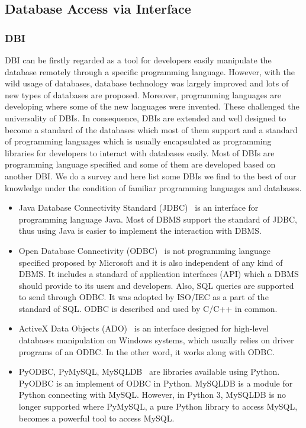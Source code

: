 \documentclass[onecolumn, conference, 12pt]{IEEEtran}
\begin{document}
	
	
	\subsection{Database Access via Interface}
	\subsubsection{DBI}
	DBI can be firstly regarded as a tool for developers easily manipulate the database remotely through a specific programming language. However, with the wild usage of databases, database technology was largely improved and lots of new types of databases are proposed. Moreover, programming languages are developing where some of the new languages were invented. These challenged the universality of DBIs. In consequence, DBIs are extended and well designed to become a standard of the databases which most of them support and a standard of programming languages which is usually encapsulated as programming libraries for developers to interact with databases easily. Most of DBIs are programming language specified and some of them are developed based on another DBI. We do a survey and here list some DBIs we find to the best of our knowledge under the condition of familiar programming languages and databases. 
	\begin{itemize}[]
		\item Java Database Connectivity Standard (JDBC)~\cite{JDBC} is an interface for programming language Java. Most of DBMS support the standard of JDBC, thus using Java is easier to implement the interaction with DBMS.
		\item Open Database Connectivity (ODBC)~\cite{ODBC} is not programming language specified proposed by Microsoft and it is also independent of any kind of DBMS. It includes a standard of application interfaces (API) which a DBMS should provide to its users and developers. Also, SQL queries are supported to send through ODBC. It was adopted by ISO/IEC as a part of the standard of SQL. ODBC is described and used by C/C++ in common.
		\item ActiveX Data Objects (ADO)~\cite{ADO} is an interface designed for high-level databases manipulation on Windows systems, which usually relies on driver programs of an ODBC. In the other word, it works along with ODBC.
		\item PyODBC, PyMySQL, MySQLDB~\cite{pyodbc,pymysql,mysqldb} are libraries available using Python. PyODBC is an implement of ODBC in Python. MySQLDB is a module for Python connecting with MySQL. However, in Python 3, MySQLDB is no longer supported where PyMySQL, a pure Python library to access MySQL, becomes a powerful tool to access MySQL.
	\end{itemize}
	
\end{document}
